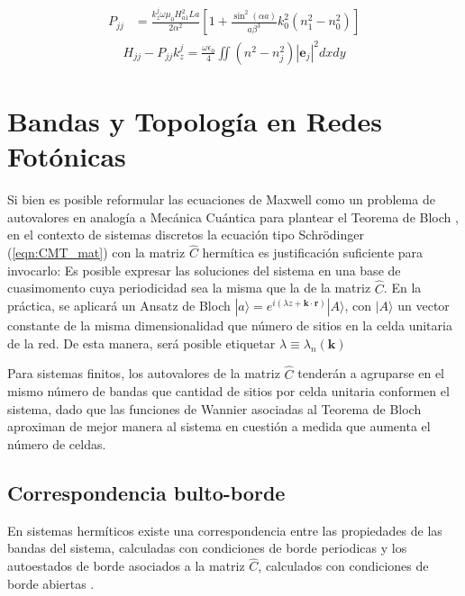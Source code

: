 \begin{align*}
	P_{jj} &= \frac{k_z^j \omega\mu_0H_{a1}^2 L a}{2 \alpha^2} \left[1 + \frac{\sin^2(\alpha a)}{a \beta^3 } k_0^2 \left( n_1^2 - n_0^2 \right) \right]
\end{align*}
\begin{align*}
	H_{jj} - P_{jj} k_z^j = \frac{\omega\epsilon_0}{4} \iint (n^2 - n_j^2)|\textbf{e}_j|^2 dx dy
\end{align*}

\section{Bandas y Topología en Redes Fotónicas}

Si bien es posible reformular las ecuaciones de Maxwell como un problema de autovalores en analogía a Mecánica Cuántica para plantear el Teorema de Bloch \cite{joannopoulos_photonic_2008}, en el contexto de sistemas discretos la ecuación tipo Schrödinger (\ref{eqn:CMT_mat}) con la matriz $\hat{C}$ hermítica es justificación suficiente para invocarlo: Es posible expresar las soluciones del sistema en una base de cuasimomento cuya periodicidad sea la misma que la de la matriz $\hat{C}$. En la práctica, se aplicará un Ansatz de Bloch $|a\rangle = e^{i(\lambda z + \textbf{k}\cdot \textbf{r})}|A\rangle$, con $|A\rangle$ un vector constante de la misma dimensionalidad que número de sitios en la celda unitaria de la red. De esta manera, será posible etiquetar $\lambda \equiv \lambda_n(\textbf{k})$

Para sistemas finitos, los autovalores de la matriz $\hat{C}$ tenderán a agruparse en el mismo número de bandas que cantidad de sitios por celda unitaria conformen el sistema, dado que las funciones de Wannier asociadas al Teorema de Bloch aproximan de mejor manera al sistema en cuestión a medida que aumenta el número de celdas.

\subsection{Correspondencia bulto-borde}
En sistemas hermíticos existe una correspondencia entre las propiedades de las bandas del sistema, calculadas con condiciones de borde periodicas y los autoestados de borde asociados a la matriz $\hat{C}$, calculados con condiciones de borde abiertas \cite{topobulk}.


